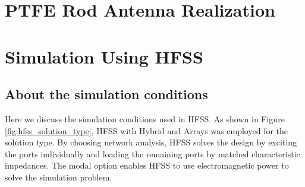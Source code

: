\documentclass[a4paper,12pt]{report}
\begin{document}
\section{PTFE Rod Antenna Realization}

\section{Simulation Using HFSS}

\subsection{About the simulation conditions}

Here we discuss the simulation conditions used in HFSS.
As shown in Figure \ref{fig:hfss_solution_type},
HFSS with Hybrid and Arrays was employed for the solution type.
By choosing network analysis,
HFSS solves the design by exciting the ports individually
and loading the remaining ports by matched characteristic impedances.
The modal option enables HFSS to use electromagnetic power to solve the simulation problem.
\end{document}
